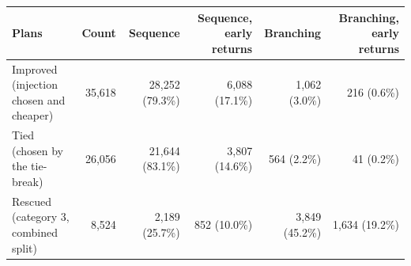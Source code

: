 \begin{tabular}{>{\raggedright\arraybackslash}p{5.2cm}rrrrr}
\toprule
Plans & Count & Sequence & Sequence, early returns & Branching & Branching, early returns \\
\midrule
Improved (injection chosen and cheaper) & 35{,}618 & 28{,}252 (79.3\%) & 6{,}088 (17.1\%) & 1{,}062 (3.0\%) & 216 (0.6\%) \\
Tied (chosen by the tie-break) & 26{,}056 & 21{,}644 (83.1\%) & 3{,}807 (14.6\%) & 564 (2.2\%) & 41 (0.2\%) \\
Rescued (category 3, combined split) & 8{,}524 & 2{,}189 (25.7\%) & 852 (10.0\%) & 3{,}849 (45.2\%) & 1{,}634 (19.2\%) \\
\bottomrule
\end{tabular}
